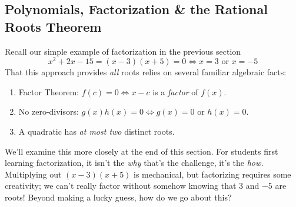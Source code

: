 \clearpage



\subsection{Polynomials, Factorization \& the Rational Roots Theorem}

Recall our simple example of factorization in the previous section
\[
	x^2+2x-15=(x-3)(x+5)=0\iff x=3\text{ or }x=-5
\]
That this approach provides \emph{all} roots relies on several familiar algebraic facts:
\begin{enumerate}
  \item Factor Theorem: $f(c)=0\iff x-c$ is a \emph{factor} of $f(x)$.
  \item No zero-divisors: $g(x)h(x)=0\iff g(x)=0$ or $h(x)=0$. 
  \item A quadratic has \emph{at most two} distinct roots.
\end{enumerate}
We'll examine this more closely at the end of this section. For students first learning factorization, it isn't the \emph{why} that's the challenge, it's the \emph{how.} Multiplying out $(x-3)(x+5)$ is mechanical, but factorizing requires some creativity; we can't really factor without somehow knowing that 3 and $-5$ are roots! Beyond making a lucky guess, how do we go about this? 

